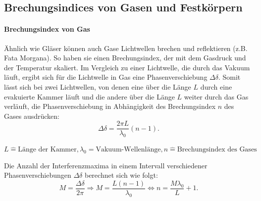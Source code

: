 \FloatBarrier
\subsection{Brechungsindices von Gasen und Festkörpern}
\paragraph{Brechungsindex von Gas}
Ähnlich wie Gläser können auch Gase Lichtwellen brechen und reflektieren (z.B. Fata Morgana).
So haben sie einen Brechungsindex, der mit dem Gasdruck und der Temperatur skaliert.
Im Vergleich zu einer Lichtwelle, die durch das Vakuum läuft, ergibt sich für die Lichtwelle in Gas eine Phasenverschiebung $\Delta \delta$.
Somit lässt sich bei zwei Lichtwellen, von denen eine über die Länge $L$ durch eine evakuierte Kammer läuft und die andere über die Länge $L$ weiter durch das Gas verläuft, die Phasenverschiebung in Abhängigkeit des Brechungsindex $n$ des Gases ausdrücken:
\begin{equation*}
	\Delta \delta = \frac{2 \pi L}{\lambda_{0}} (n-1) .
\end{equation*}
\begin{center}
	\tiny{$L \widehat{=} \text{Länge der Kammer}, \lambda_{0}{=} \text{Vakuum-Wellenlänge}, n \widehat{=} \text{Brechungsindex des Gases}$}
\end{center}
Die Anzahl der Interferenzmaxima in einem Intervall verschiedener Phasenverschiebungen $\Delta \delta$ berechnet sich wie folgt:
\begin{equation}
	M = \frac{\Delta \delta}{2 \pi} \Rightarrow M = \frac{L (n-1)}{\lambda_{0}} \Leftrightarrow n = \frac{M \lambda_{0}}{L} +1.
	\label{eqn:brechungsindex_gas}
\end{equation}

